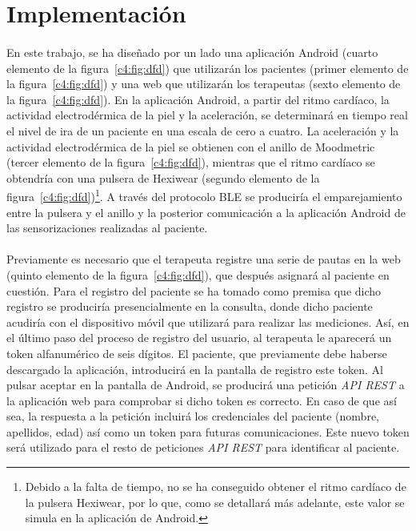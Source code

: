 \section{Implementación}
\label{c4:sec:impl}
\paragraph{}
En este trabajo, se ha diseñado por un lado una aplicación Android (cuarto elemento de la figura~\ref{c4:fig:dfd}) que utilizarán los pacientes (primer elemento de la figura~\ref{c4:fig:dfd}) y una web que utilizarán los terapeutas (sexto elemento de la figura~\ref{c4:fig:dfd}). En la aplicación Android, a partir del ritmo cardíaco, la actividad electrodérmica de la piel y la aceleración, se determinará en tiempo real el nivel de ira de un paciente en una escala de cero a cuatro. La aceleración y la actividad electrodérmica de la piel se obtienen con el anillo de Moodmetric (tercer elemento de la figura~\ref{c4:fig:dfd}), mientras que el ritmo cardíaco se obtendría con una pulsera de Hexiwear (segundo elemento de la figura~\ref{c4:fig:dfd})\footnote{Debido a la falta de tiempo, no se ha conseguido obtener el ritmo cardíaco de la pulsera Hexiwear, por lo que, como se detallará más adelante, este valor se simula en la aplicación de Android.}. A través del protocolo BLE se produciría el emparejamiento entre la pulsera y el anillo y la posterior comunicación a la aplicación Android de las sensorizaciones realizadas al paciente.

\paragraph{}
Previamente es necesario que el terapeuta registre una serie de pautas en la web (quinto elemento de la figura~\ref{c4:fig:dfd}), que después asignará al paciente en cuestión. Para el registro del paciente se ha tomado como premisa que dicho registro se produciría presencialmente en la consulta, donde dicho paciente acudiría con el dispositivo móvil que utilizará para realizar las mediciones. Así, en el 
último paso del proceso de registro del usuario, al terapeuta le aparecerá un token alfanumérico de seis dígitos. El paciente, que previamente debe haberse descargado la aplicación, introducirá en la pantalla de registro este token. Al pulsar aceptar en la pantalla de Android, se producirá una petición \textit{API REST} a la aplicación web para comprobar si dicho token es correcto. En caso de que así sea, la respuesta a la petición incluirá los credenciales del paciente (nombre, apellidos, edad) así como un token para futuras comunicaciones. Este nuevo token será utilizado para el resto de peticiones \textit{API REST} para identificar al paciente.

